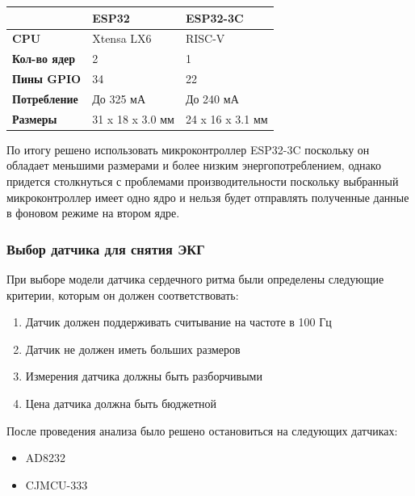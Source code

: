 \documentclass[12pt, russian]{extarticle}
\begin{document}
\begin{spacing}{1.5}
\begin{center}
\begin{tabular}{|l|l|l|}
\hline
\textbf{}            & \textbf{ESP32} & \textbf{ESP32-3C} \\ \hline
\textbf{CPU}         & Xtensa LX6                             & RISC-V                                    \\ \hline
\textbf{Кол-во ядер} & 2                                      & 1                                         \\ \hline
\textbf{Пины GPIO}        & 34                                     & 22                                        \\ \hline
\textbf{Потребление} & До 325 мА                              & До 240 мА                                 \\ \hline
\textbf{Размеры}     & 31 x 18 x 3.0 мм                       & 24 x 16 x 3.1 мм                          \\ \hline
\end{tabular}
\end{center}

По итогу решено использовать микроконтроллер ESP32-3C поскольку он обладает меньшими размерами и более низким энергопотреблением, однако придется столкнуться с проблемами производительности поскольку выбранный микроконтроллер имеет одно ядро и нельзя будет отправлять полученные данные в фоновом режиме на втором ядре.

\subsubsection{Выбор датчика для снятия ЭКГ}

При выборе модели датчика сердечного ритма были определены следующие критерии, которым он должен соответствовать: 

\begin{enumerate}
    \item Датчик должен поддерживать считывание на частоте в 100 Гц
    \item Датчик не должен иметь больших размеров
    \item Измерения датчика должны быть разборчивыми
    \item Цена датчика должна быть бюджетной
\end{enumerate}

После проведения анализа было решено остановиться на следующих датчиках: 

\begin{itemize}
    \item AD8232
    \item CJMCU-333
\end{itemize}


\end{spacing}
\end{document}
